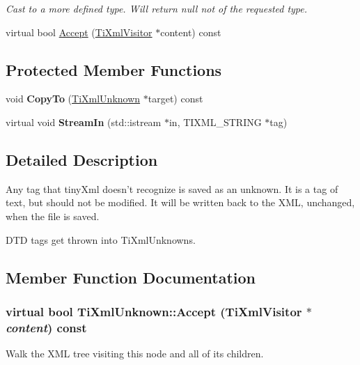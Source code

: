 \begin{DoxyCompactItemize}
\begin{DoxyCompactList}\small\item\em Cast to a more defined type. Will return null not of the requested type. \item\end{DoxyCompactList}\item 
virtual bool \hyperlink{class_ti_xml_unknown_ad7122e5135581b3c832a1a3217760a93}{Accept} (\hyperlink{class_ti_xml_visitor}{TiXmlVisitor} $\ast$content) const 
\end{DoxyCompactItemize}
\subsection*{Protected Member Functions}
\begin{DoxyCompactItemize}
\item 
\hypertarget{class_ti_xml_unknown_a08ca7b225a2bcb604d3c72e199d33408}{
void {\bfseries CopyTo} (\hyperlink{class_ti_xml_unknown}{TiXmlUnknown} $\ast$target) const }
\label{class_ti_xml_unknown_a08ca7b225a2bcb604d3c72e199d33408}

\item 
\hypertarget{class_ti_xml_unknown_ad3f8fcc1efe364ddd8f43ef9a1046300}{
virtual void {\bfseries StreamIn} (std::istream $\ast$in, TIXML\_\-STRING $\ast$tag)}
\label{class_ti_xml_unknown_ad3f8fcc1efe364ddd8f43ef9a1046300}

\end{DoxyCompactItemize}


\subsection{Detailed Description}
Any tag that tinyXml doesn't recognize is saved as an unknown. It is a tag of text, but should not be modified. It will be written back to the XML, unchanged, when the file is saved.

DTD tags get thrown into TiXmlUnknowns. 

\subsection{Member Function Documentation}
\hypertarget{class_ti_xml_unknown_ad7122e5135581b3c832a1a3217760a93}{
\subsubsection[{Accept}]{\setlength{\rightskip}{0pt plus 5cm}virtual bool TiXmlUnknown::Accept ({\bf TiXmlVisitor} $\ast$ {\em content}) const}}
\label{class_ti_xml_unknown_ad7122e5135581b3c832a1a3217760a93}
Walk the XML tree visiting this node and all of its children. 

